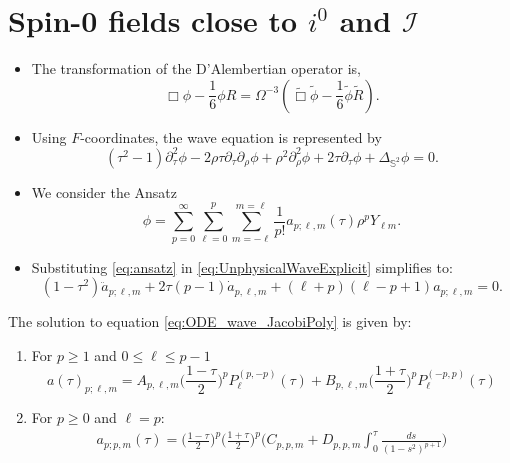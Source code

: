 \documentclass{beamer}
\theoremstyle{remark}
\theoremstyle{plain}
\theoremstyle{plain}
\begin{document}
\section{Spin-0 fields close to $i^0$ and $\mathscr{I}$}
\begin{frame}
  \begin{itemize}
    \item The transformation of the D'Alembertian operator is,
    \begin{equation}\label{eq:waveConfTr}
      \Box \phi-\frac{1}{6} \phi R=\Omega^{-3}\left(\tilde{\Box} \tilde{\phi}-\frac{1}{6} \tilde{\phi} \tilde{R}\right). \nonumber 
    \end{equation}
    \item Using $F$-coordinates, the wave equation is represented by
    \begin{equation}\label{eq:UnphysicalWaveExplicit}
      \left(\tau^2-1\right) \partial_\tau^2 \phi-2 \rho \tau \partial_\tau \partial_\rho \phi+\rho^2 \partial_\rho^2 \phi+2 \tau \partial_\tau \phi+\Delta_{\mathbb{S}^2} \phi=0.
    \end{equation}
    \item We consider the Ansatz
    \begin{equation}\label{eq:ansatz}
      \phi = \sum_{p = 0}^{\infty}\sum_{\ell = 0}^{p}\sum_{m = -\ell}^{m = \ell}\frac{1}{p!}a_{p;\ell,m}(\tau)\rho^{p}Y_{\ell m}.
    \end{equation}
    \item Substituting \eqref{eq:ansatz} in \eqref{eq:UnphysicalWaveExplicit} simplifies to:
    \begin{equation}\label{eq:ODE_wave_JacobiPoly}
      (1-\tau^2)\ddot{a}_{p;\ell,m} + 2\tau(p-1)\dot{a}_{p,\ell,m}+(\ell+p)(\ell-p+1){a}_{p;\ell,m}=0.
    \end{equation}
  \end{itemize}
\end{frame}

\begin{frame}
  \begin{lemma}\label{Lemma:Sol_Jacobi_and_Logs} The solution to equation \eqref{eq:ODE_wave_JacobiPoly} is given
      by:
      \begin{enumerate}
      \item For $p\geq 1$ and $0\leq \ell \leq p-1$
       \begin{equation}\label{eq:Sol_jac_poly}
        a(\tau)_{p;\ell,m} =A_{p,\ell,m}\bigg(\frac{1-\tau}{2}\bigg)^{p}P_{\ell}^{(p,-p)}(\tau) + B_{p,\ell,m}\bigg(\frac{1+\tau}{2}\bigg)^{p}P_{\ell}^{(-p,p)}(\tau) \nonumber 
       \end{equation}
      
      \item For $p\geq 0$ and $\ell=p$:
         \begin{align}\label{eq:Sol_highestharmonic}
          {a}_{p;p,m}(\tau) =\bigg(\frac{1-\tau}{2}\bigg)^{p}\bigg(\frac{1+\tau}{2}\bigg)^{p}\Bigg(C_{p,p,m}+D_{p,p,m}\int_{0}^{\tau} \frac{ds}{(1-s^2)^{p+1}}\Bigg)
         \end{align}
      \end{enumerate}
  \end{lemma}
\end{frame}
\end{document}
